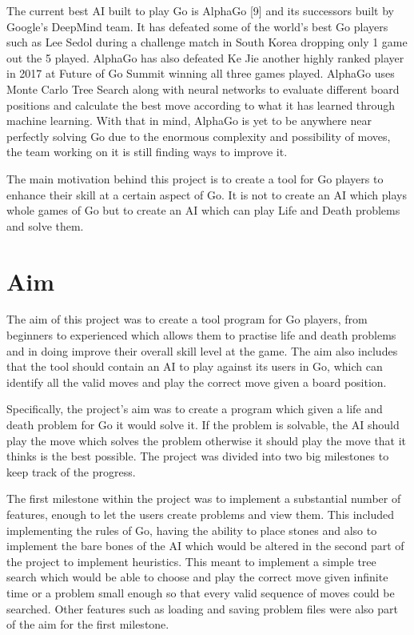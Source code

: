 \documentclass{l4proj}
\begin{document}
The current best AI built to play Go is AlphaGo [9] and its successors built by Google’s DeepMind team. It has defeated some of the world’s best Go players such as Lee Sedol during a challenge match in South Korea dropping only 1 game out the 5 played. AlphaGo has also defeated Ke Jie another highly ranked player in 2017 at Future of Go Summit winning all three games played. AlphaGo uses Monte Carlo Tree Search along with neural networks to evaluate different board positions and calculate the best move according to what it has learned through machine learning. With that in mind, AlphaGo is yet to be anywhere near perfectly solving Go due to the enormous complexity and possibility of moves, the team working on it is still finding ways to improve it.

The main motivation behind this project is to create a tool for Go players to enhance their skill at a certain aspect of Go. It is not to create an AI which plays whole games of Go but to create an AI which can play Life and Death problems and solve them.


\section{Aim}
The aim of this project was to create a tool program for Go players, from beginners to experienced which allows them to practise life and death problems and in doing improve their overall skill level at the game.  The aim also includes that the tool should contain an AI to play against its users in Go, which can identify all the valid moves and play the correct move given a board position.

Specifically, the project’s aim was to create a program which given a life and death problem for Go it would solve it. If the problem is solvable,  the AI should play the move which solves the problem otherwise it should play the move that it thinks is the best possible. The project was divided into two big milestones to keep track of the progress.

The first milestone within the project was to implement a substantial number of features, enough to let the users create problems and view them. This included implementing the rules of Go, having the ability to place stones and also to implement the bare bones of the AI which would be altered in the second part of the project to implement heuristics. This meant to implement a simple tree search which would be able to choose and play the correct move given infinite time or a problem small enough so that every valid sequence of moves could be searched. Other features such as loading and saving problem files were also part of the aim for the first milestone.
\end{document}
